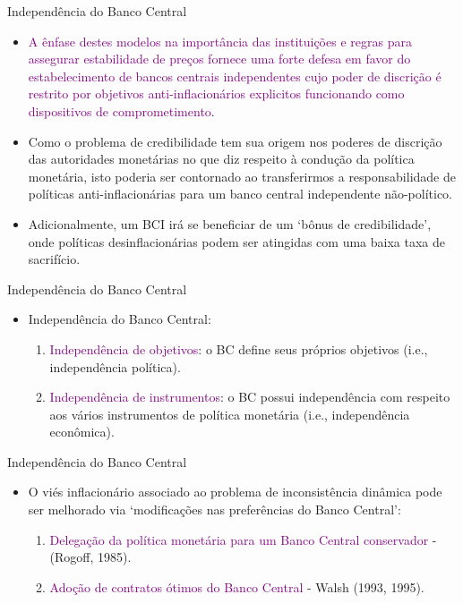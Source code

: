 \documentclass[10pt]{beamer}
\begin{document}
\begin{frame}{Independência do Banco Central}
    \begin{itemize}
        \item \textcolor{purple}{A ênfase destes modelos na importância das instituições e regras para assegurar estabilidade de preços fornece uma forte defesa em favor do estabelecimento de bancos centrais independentes cujo poder de discrição é restrito por objetivos anti-inflacionários explicitos funcionando como dispositivos de comprometimento}.
        \bigskip
        \item Como o problema de credibilidade tem sua origem nos poderes de discrição das autoridades monetárias no que diz respeito à condução da política monetária, isto poderia ser contornado ao transferirmos a responsabilidade de políticas anti-inflacionárias para um banco central independente não-político.
        \bigskip
        \item Adicionalmente, um BCI irá se beneficiar de um `bônus de credibilidade', onde políticas desinflacionárias podem ser atingidas com uma baixa taxa de sacrifício.
    \end{itemize}
\end{frame}

\begin{frame}{Independência do Banco Central}
    \begin{itemize}
        \item Independência do Banco Central:
        \bigskip
        \begin{enumerate}
            \item \textcolor{purple}{Independência de objetivos}: o BC define seus próprios objetivos (i.e., independência política).
            \bigskip
            \item \textcolor{purple}{Independência de instrumentos}: o BC possui independência com respeito aos vários instrumentos de política monetária (i.e., independência econômica).
        \end{enumerate}
    \end{itemize}
\end{frame}

\begin{frame}{Independência do Banco Central}
    \begin{itemize}
        \item O  viés inflacionário associado ao problema de inconsistência dinâmica pode ser melhorado via `modificações nas preferências do Banco Central':
        \bigskip
        \begin{enumerate}
            \item \textcolor{purple}{Delegação da política monetária para um Banco Central conservador} - (Rogoff, 1985).
            \bigskip
            \item \textcolor{purple}{Adoção de contratos ótimos do Banco Central} - Walsh (1993, 1995).
        \end{enumerate}
    \end{itemize}
\end{frame}
\end{document}
